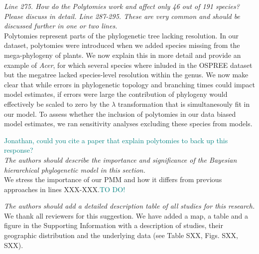 \documentclass[11pt]{article}
\begin{document}
\emph{Line 275. How do the Polytomies work and affect only 46 out of 191 species? Please discuss in detail. Line 287-295. These are very common and should be discussed further in one or two lines.}\\
Polytomies represent parts of the phylogenetic tree lacking resolution. In our dataset, polytomies were introduced when we added species missing from the mega-phylogeny of plants. We now explain this in more detail and provide an example of \emph{Acer}, for which several species where inluded in the OSPREE dataset but the megatree lacked species-level resolution within the genus. We now make clear that while errors in phylogenetic topology and branching times could impact model estimates, if errors were large the contribution of phylogeny would effectively be scaled to zero by the $\lambda$ transformation that is simultanesouly fit in our model. To assess whether the inclusion of polytomies in our data biased model estimates, we ran sensitivity analyses excluding these species from models.


\textcolor{teal}{Jonathan, could you  cite a paper that explain polytomies to back up this response?}\\

\emph{The authors should describe the importance and significance of the Bayesian hierarchical phylogenetic model in this section.}\\
We stress the importance of our PMM and how it differs from previous approaches in lines XXX-XXX.\textcolor{teal}{TO DO!}


\emph{The authors should add a detailed description table of all studies for this research.}\\
We thank all reviewers for this suggestion. We have added a map, a table and a figure in the Supporting Information with a description of studies, their geographic distribution and the underlying data (see Table SXX, Figs. SXX, SXX).
\end{document}
